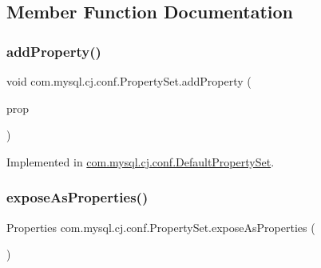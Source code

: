 \subsection{Member Function Documentation}
\mbox{\label{interfacecom_1_1mysql_1_1cj_1_1conf_1_1_property_set_aa3494caf662b2b4b83115e0c46c6c6bf}} 
\subsubsection{\texorpdfstring{add\+Property()}{addProperty()}}
{\footnotesize\ttfamily void com.\+mysql.\+cj.\+conf.\+Property\+Set.\+add\+Property (\begin{DoxyParamCaption}\item[{\mbox{\hyperlink{interfacecom_1_1mysql_1_1cj_1_1conf_1_1_runtime_property}{Runtime\+Property}}$<$?$>$}]{prop }\end{DoxyParamCaption})}



Implemented in \mbox{\hyperlink{classcom_1_1mysql_1_1cj_1_1conf_1_1_default_property_set_aaab8bb4b45a6e77efa0987edee78924c}{com.\+mysql.\+cj.\+conf.\+Default\+Property\+Set}}.

\mbox{\label{interfacecom_1_1mysql_1_1cj_1_1conf_1_1_property_set_a1742a6e5438541b51a5794654bf98489}} 
\subsubsection{\texorpdfstring{expose\+As\+Properties()}{exposeAsProperties()}}
{\footnotesize\ttfamily Properties com.\+mysql.\+cj.\+conf.\+Property\+Set.\+expose\+As\+Properties (\begin{DoxyParamCaption}{ }\end{DoxyParamCaption})}



